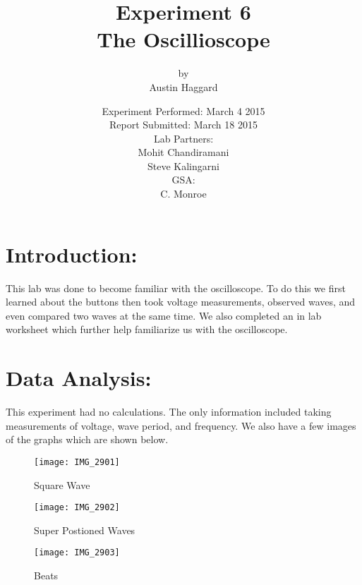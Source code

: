 \documentclass{article}
\title{Experiment 6 \\ The Oscillioscope}
\author{by \\ Austin Haggard}
\date{
	Experiment Performed: March 4 2015 \\
	Report Submitted: March 18 2015 \\[11pt]
	Lab Partners: \\ Mohit Chandiramani \\ Steve Kalingarni \\[11pt] 
	GSA: \\ C. Monroe
}
\begin{document}
\maketitle
\thispagestyle{empty}
\newpage

\section*{Introduction:}
\setcounter{page}{1}
This lab was done to become familiar with the oscilloscope.  To do this we first learned about the buttons then took voltage measurements, observed waves, and even compared two waves at the same time.  We also completed an in lab worksheet which further help familiarize us with the oscilloscope. 
\newpage


\section*{Data Analysis:}
\setcounter{page}{3}
This experiment had no calculations.  The only information included taking measurements of voltage, wave period, and frequency.  We also have a few images of the graphs which are shown below.

\begin{figure}[h]
\caption{Square Wave}
\centering
\texttt{[image: IMG\_2901]} 
\end{figure}

\begin{figure}[h]
\caption{Super Postioned Waves}
\centering
\texttt{[image: IMG\_2902]}
\end{figure}

\begin{figure}[h]
\caption{Beats}
\centering
\texttt{[image: IMG\_2903]}
\end{figure}
\newpage
\end{document}
